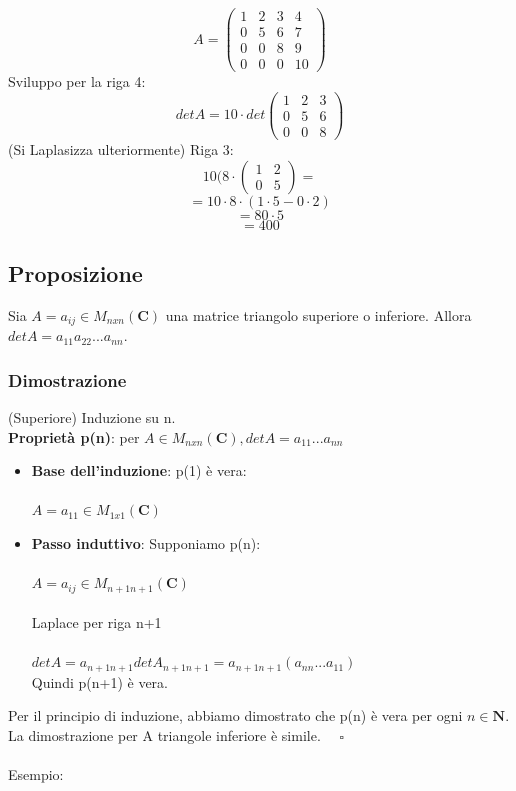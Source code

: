 \documentclass[12pt]{article}
\begin{document}
\[A = \begin{pmatrix}
    1 & 2 & 3 & 4\\
    0 & 5 & 6 & 7\\
    0 & 0 & 8 & 9\\
    0 & 0 & 0 & 10
\end{pmatrix}\]
Sviluppo per la riga 4:
\[detA = 10 \cdot det \begin{pmatrix}
    1 & 2 & 3\\
    0 & 5 & 6\\
    0 & 0 & 8
\end{pmatrix}\]
(Si Laplasizza ulteriormente) Riga 3:
\[10 (8 \cdot \begin{pmatrix}
    1 & 2\\
    0 & 5
\end{pmatrix} =\]
\[= 10 \cdot 8 \cdot (1 \cdot 5 - 0 \cdot 2)\]
\[= 80 \cdot 5\]
\[= 400\]

\subsection{Proposizione}
Sia $A = a_{ij} \in M_{nxn} (\mathbf{C})$ una matrice triangolo superiore o inferiore. Allora $detA = a_{11}a_{22} ... a_{nn}$.

\subsubsection{Dimostrazione}

(Superiore) Induzione su n.
\\
\textbf{Proprietà p(n)}: per $A \in M_{nxn} (\mathbf{C}), detA = a_{11} ... a_{nn}$
\begin{itemize}
    \item \textbf{Base dell'induzione}: p(1) è vera:\\\\
    $A = a_{11} \in M_{1x1} (\mathbf{C})$
    \item \textbf{Passo induttivo}: Supponiamo p(n): \\\\$A = a_{ij} \in M_{n+1n+1} (\mathbf{C})$\\\\
    Laplace per riga n+1\\\\
    $detA = a_{n+1n+1} detA_{n+1n+1} = a_{n+1n+1} (a_{nn}...a_{11})$\\
    Quindi p(n+1) è vera.
\end{itemize}
Per il principio di induzione, abbiamo dimostrato che p(n) è vera per ogni $n \in \mathbf{N}$. La dimostrazione per A triangole inferiore è simile. $\quad \square$\\\\
Esempio:
\end{document}
